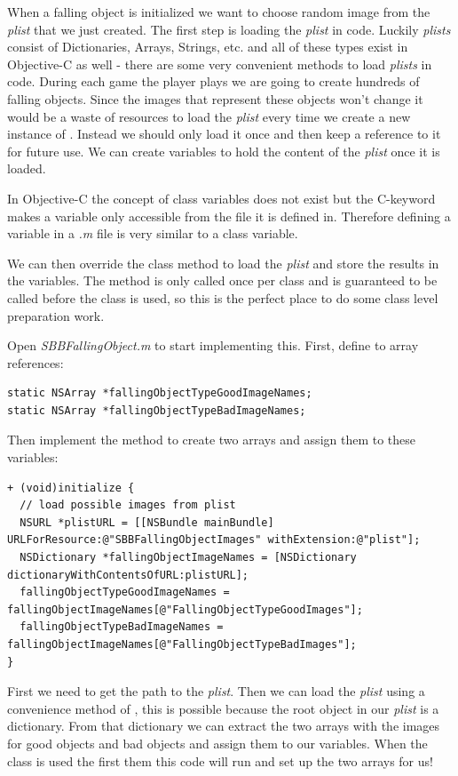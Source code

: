 When a falling object is initialized we want to
choose random image from the \textit{plist} that we just created.
The first step is loading the \textit{plist} in code. Luckily \textit{plists}
consist of Dictionaries, Arrays, Strings, etc. and all of these types exist in
Objective-C as well - there are some very convenient methods to load
\textit{plists} in code. During each game the player plays we are going to create hundreds of
falling objects. Since the images that represent these objects won't change it
would be a waste of resources to load the \textit{plist} every time we create a
new instance of . Instead we should only load it
once and then keep a reference to it for future use. We can create
 variables to hold the content of the \textit{plist} once it
is loaded. 

\begin{details}[frametitle={Static variables in Objective-C}] 
In Objective-C the concept of class variables does not exist but the C-keyword
 makes a variable only accessible from the file it is
defined in. Therefore defining a  variable in a \textit{.m}
file is very similar to a class variable.
\end{details}

We can then override the class method  to load the
\textit{plist} and store the results in the  variables. The
 method is only called once per class and is guaranteed
to be called before the class is used, so this is the perfect place to do some
class level preparation work.

Open \textit{SBBFallingObject.m} to start implementing
this. First, define to  array references:
\begin{lstlisting}
static NSArray *fallingObjectTypeGoodImageNames;
static NSArray *fallingObjectTypeBadImageNames;
\end{lstlisting}
Then implement the  method to create two arrays and
assign them to these variables:
\begin{lstlisting}
+ (void)initialize {
  // load possible images from plist
  NSURL *plistURL = [[NSBundle mainBundle] URLForResource:@"SBBFallingObjectImages" withExtension:@"plist"];
  NSDictionary *fallingObjectImageNames = [NSDictionary dictionaryWithContentsOfURL:plistURL];
  fallingObjectTypeGoodImageNames = fallingObjectImageNames[@"FallingObjectTypeGoodImages"];
  fallingObjectTypeBadImageNames = fallingObjectImageNames[@"FallingObjectTypeBadImages"];
}
\end{lstlisting}
First we need to get the path to the \textit{plist}. Then we can load the
\textit{plist} using a convenience method of , this is
possible because the root object in our \textit{plist} is a dictionary. From
that dictionary we can extract the two arrays with the images for good objects
and bad objects and assign them to our  variables. When the
 class is used the first them this code will run
and set up the two arrays for us!

